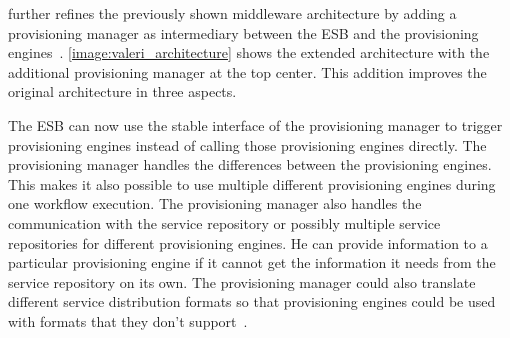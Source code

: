 \citeauthor*{provisioning:dynamic} further refines the previously shown middleware architecture by adding a provisioning manager as intermediary between the ESB and the provisioning engines~\autocite{provisioning:dynamic}.
\autoref{image:valeri_architecture} shows the extended architecture with the additional provisioning manager at the top center.
This addition improves the original architecture in three aspects.

The ESB can now use the stable interface of the provisioning manager to trigger provisioning engines instead of calling those provisioning engines directly.
The provisioning manager handles the differences between the provisioning engines.
This makes it also possible to use multiple different provisioning engines during one workflow execution.
The provisioning manager also handles the communication with the service repository or possibly multiple service repositories for different provisioning engines.
He can provide information to a particular provisioning engine if it cannot get the information it needs from the service repository on its own.
The provisioning manager could also translate different service distribution formats so that provisioning engines could be used with formats that they don't support~\autocite{provisioning:dynamic}.
